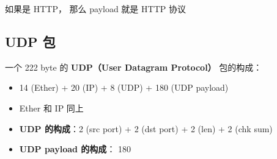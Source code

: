 如果是 HTTP， 那么 payload 就是 HTTP 协议


\subsection{UDP 包}
一个 222 byte 的 \textbf{UDP（User Datagram Protocol）} 包的构成：
\begin{itemize}
\item 14 (Ether) + 20 (IP) + 8 (UDP) + 180 (UDP payload)
\item Ether 和 IP 同上
\item \textbf{UDP 的构成}：2 (src port) + 2 (dst port) + 2 (len) + 2 (chk sum)
\item \textbf{UDP payload 的构成}： 180
\end{itemize}
